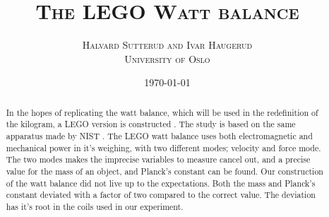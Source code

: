 \documentclass[english,a4paper,12pt,reprint]{revtex4-1}
\begin{document}
\title{\textsc{The LEGO Watt balance}}
\author{\textsc{Halvard Sutterud and Ivar Haugerud}\\\textsc{University of Oslo}}
\date{\today}

\begin{abstract}
In the hopes of replicating the watt balance, which will be used in the redefinition of the kilogram, a LEGO version is constructed . The study is based on the same apparatus made by NIST \cite{chao_lego_2015}. The LEGO watt balance uses both electromagnetic and mechanical power in it's weighing, with two different modes; velocity and force mode. The two modes makes the imprecise variables to measure cancel out, and a precise value for the mass of an object, and Planck's constant can be found. Our construction of the watt balance did not live up to the expectations. Both the mass and Planck's constant deviated with a factor of two compared to the correct value. The deviation has it's root in the coils used in our experiment.

\end{abstract}

\maketitle{}
\end{document}
